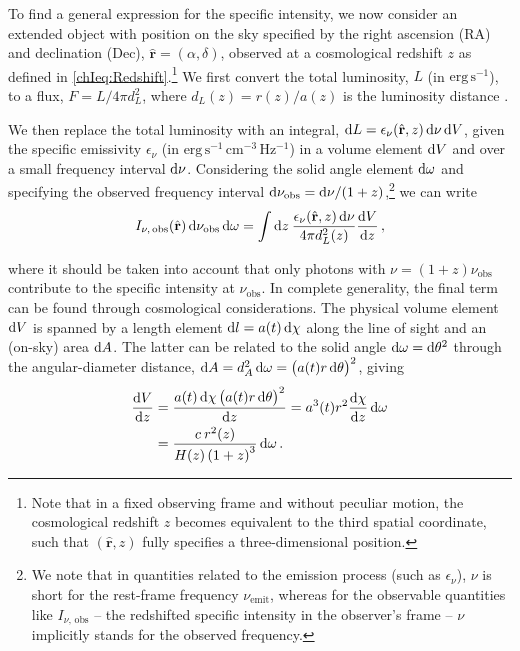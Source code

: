 To find a general expression for the specific intensity, we now consider an extended object with position on the sky specified by the right ascension (RA) and declination (Dec), $\hat{\mathbf{r}} = (\alpha, \delta)$, observed at a cosmological redshift $z$ as defined in \cref{chIeq:Redshift}.\footnote{Note that in a fixed observing frame and without peculiar motion, the cosmological redshift $z$ becomes equivalent to the third spatial coordinate, such that $(\hat{\mathbf{r}}, z)$ fully specifies a three-dimensional position.} We first convert the total luminosity, $L$ (in $\mathrm{erg \, s^{-1}}$), to a flux, $F = L / 4 \pi d_L^2$, where $d_L(z) = r(z) / a(z)$ is the luminosity distance \citep[e.g.][]{1999astro.ph..5116H}.

We then replace the total luminosity with an integral, $\dif L = \epsilon_\nu (\hat{\mathbf{r}}, z) \dif \nu \dif V$, given the specific emissivity $\epsilon_\nu$ (in $\mathrm{erg \, s^{-1} \, cm^{-3} \, Hz^{-1}}$) in a volume element $\dif V$ and over a small frequency interval $\dif \nu$. Considering the solid angle element $\dif \omega$ and specifying the observed frequency interval $\dif \nu_\text{obs} = \dif \nu / (1+z)$,\footnote{We note that in quantities related to the emission process (such as $\epsilon_\nu$), $\nu$ is short for the rest-frame frequency $\nu_\text{emit}$, whereas for the observable quantities like $I_{\nu, \, \text{obs}}$ -- the redshifted specific intensity in the observer's frame -- $\nu$ implicitly stands for the observed frequency.} we can write
\begin{equation}
    \label{chIeq:Specific_intensity_integral1}
    I_{\nu, \, \text{obs}} (\hat{\mathbf{r}}) \dif \nu_\text{obs} \dif \omega = \int \dif z \: \frac{\epsilon_\nu (\hat{\mathbf{r}}, z) \dif \nu}{4 \pi d_L^2(z)} \frac{\dif V}{\dif z} \, ,
\end{equation}

\noindent where it should be taken into account that only photons with $\nu = (1 + z) \nu_\text{obs}$ contribute to the specific intensity at $\nu_\text{obs}$. In complete generality, the final term can be found through cosmological considerations. The physical volume element $\dif V$ is spanned by a length element $\dif l = a(t) \dif \chi$ along the line of sight and an (on-sky) area $\dif A$. The latter can be related to the solid angle $\dif \omega = \dif \theta^2$ through the angular-diameter distance, $\dif A = d_A^2 \dif \omega = \left( a(t) r \dif \theta \right)^2$, giving
\begin{align}
    \label{chIeq:Cosmological_volume_element}
    \frac{\dif V}{\dif z} & = \frac{a(t) \dif \chi \left( a(t) r \dif \theta \right)^2}{\dif z} = a^3(t) r^2 \frac{\dif \chi}{\dif z} \dif \omega \nonumber
    \\
    & = \frac{c \: r^2(z)}{H(z) \left( 1 + z \right)^3} \dif \omega \, .
\end{align}

